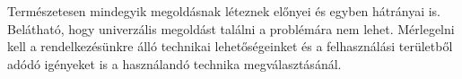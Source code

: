 Természetesen mindegyik megoldásnak léteznek előnyei és egyben hátrányai is. Belátható, hogy univerzális megoldást találni a problémára nem lehet. Mérlegelni kell a rendelkezésünkre álló technikai lehetőségeinket és a felhasználási területből adódó igényeket is a használandó technika megválasztásánál.
